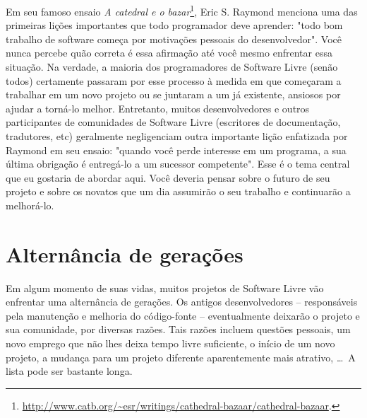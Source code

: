

\noindent{}Em seu famoso ensaio \textit{A catedral e o bazar}\footnote{\url{
http://www.catb.org/~esr/writings/cathedral-bazaar/cathedral-bazaar}.}, Eric S.
Raymond menciona uma das primeiras lições importantes que todo programador 
deve aprender: "todo bom trabalho de software começa por motivações pessoais 
do desenvolvedor". Você nunca percebe quão correta é essa afirmação até você mesmo
enfrentar essa situação. Na verdade, a maioria dos programadores de Software Livre
(senão todos) certamente passaram por esse processo à medida em que começaram
a trabalhar em um novo projeto ou se juntaram a um já existente, ansiosos por ajudar
a torná-lo melhor. Entretanto, muitos desenvolvedores e outros participantes de 
comunidades de Software Livre (escritores de documentação, tradutores, etc) geralmente
negligenciam outra importante lição enfatizada por Raymond em seu ensaio: "quando você perde
interesse em um programa, a sua última obrigação é entregá-lo a um sucessor competente".
Esse é o tema central que eu gostaria de abordar aqui. Você deveria pensar sobre o futuro
de seu projeto e sobre os novatos que um dia assumirão o seu trabalho e continuarão
a melhorá-lo.

\section*{Alternância de gerações}

Em algum momento de suas vidas, muitos projetos de Software Livre vão enfrentar
uma alternância de gerações. Os antigos desenvolvedores -- responsáveis pela manutenção
e melhoria do código-fonte -- eventualmente deixarão o projeto e sua comunidade, por diversas razões.
Tais razões incluem questões pessoais, um novo emprego que não lhes deixa tempo livre suficiente, o início de um novo projeto,
a mudança para um projeto diferente aparentemente mais atrativo, \dots\ A lista pode ser bastante longa.

